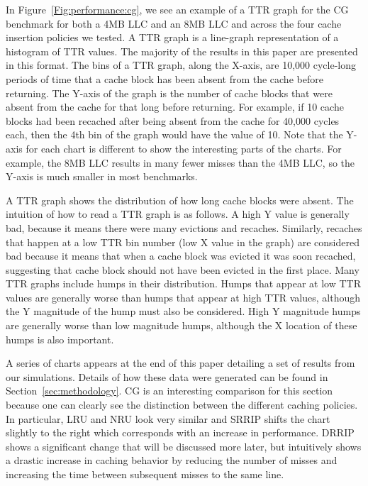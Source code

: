 In Figure~\ref{Fig:performance:cg}, we see an example of a TTR graph for 
the CG benchmark for both a 4MB LLC and an 8MB LLC and across the four 
cache insertion policies we tested.  
A TTR graph is a line-graph representation of a histogram of TTR values.  
The majority of the results in this paper are presented in this format.  
The bins of a TTR graph, along the X-axis,  are 10,000 cycle-long 
periods of time that a cache block has
been absent from the cache before returning.  The Y-axis of the graph
is the number of cache blocks that were absent from the cache for that
long before returning.  For example, if 10 cache blocks had been
recached after being absent from the cache for 40,000 cycles each,
then the 4th bin of the graph would have the value of 10.
Note that the Y-axis for each chart is different to show the interesting parts of the charts.
For example, the 8MB LLC results in many fewer misses than the 4MB LLC, 
so the Y-axis is much smaller in most benchmarks.

A TTR graph shows the distribution of how long cache blocks were
absent.  The intuition of how to read a TTR graph is as follows.  A
high Y value is generally bad, because it means there were many evictions
and recaches.  Similarly, recaches that happen at a low TTR bin number
(low X value in the graph) are considered bad because it means that
when a cache block was evicted it was soon recached, suggesting that
cache block should not have been evicted in the first place.  Many TTR
graphs include humps in their distribution.  Humps that appear at low
TTR values are generally worse than humps that appear at high TTR
values, although the Y magnitude of the hump must also be considered.
High Y magnitude humps are generally worse than low magnitude humps,
although the X location of these humps is also important.

A series of charts appears at the end of this paper detailing a set of 
results from our simulations.
Details of how these data were generated can be found in Section~\ref{sec:methodology}.
CG is an interesting comparison for this section because one can clearly 
see the distinction between the different caching policies. 
In particular, LRU and NRU look very similar and SRRIP shifts the chart 
slightly to the right which corresponds with an increase in performance.
DRRIP shows a significant change that will be discussed more later, but 
intuitively shows a drastic increase in caching behavior by reducing the 
number of misses and increasing the time between subsequent misses to the 
same line.
